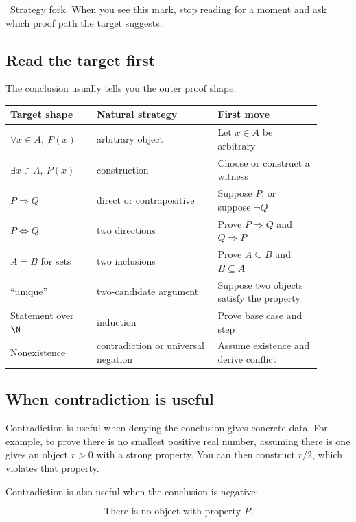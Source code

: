 \begin{marginnotebox}
\motifstrategy\ Strategy fork. When you see this mark, stop reading for a
moment and ask which proof path the target suggests.
\end{marginnotebox}

\subsection{Read the target first}

The conclusion usually tells you the outer proof shape.

\begin{longtable}{p{0.25\linewidth}p{0.35\linewidth}p{0.3\linewidth}}
\toprule
Target shape & Natural strategy & First move \\
\midrule
$\forall x\in A,\ P(x)$ & arbitrary object & Let $x\in A$ be arbitrary \\
$\exists x\in A,\ P(x)$ & construction & Choose or construct a witness \\
$P\Rightarrow Q$ & direct or contrapositive & Suppose $P$; or suppose $\neg Q$ \\
$P\Leftrightarrow Q$ & two directions & Prove $P\Rightarrow Q$ and $Q\Rightarrow P$ \\
$A=B$ for sets & two inclusions & Prove $A\subseteq B$ and $B\subseteq A$ \\
``unique'' & two-candidate argument & Suppose two objects satisfy the property \\
Statement over $\N$ & induction & Prove base case and step \\
Nonexistence & contradiction or universal negation & Assume existence and derive conflict \\
\bottomrule
\end{longtable}

\subsection{When contradiction is useful}

Contradiction is useful when denying the conclusion gives concrete data. For
example, to prove there is no smallest positive real number, assuming there is
one gives an object $r>0$ with a strong property. You can then construct
$r/2$, which violates that property.

Contradiction is also useful when the conclusion is negative:

\[
\text{There is no object with property }P.
\]

